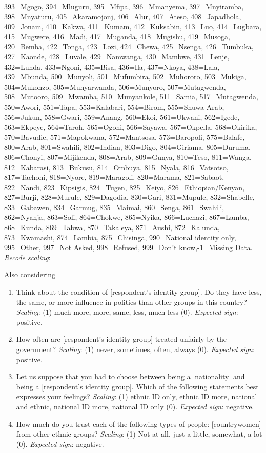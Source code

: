 \documentclass[]{article}
\begin{document}
\begin{enumerate}
393=Mgogo, 394=Mluguru, 395=Mfipa, 396=Mmanyema, 397=Mnyiramba, 398=Mnyaturu, 405=Akaramojonj, 406=Alur, 407=Ateso, 408=Japadhola, 409=Jonam, 410=Kakwa, 411=Kumam, 412=Kuksabin, 413=Luo, 414=Lugbara, 415=Mugwere, 416=Madi, 417=Muganda, 418=Mugishu, 419=Musoga, 420=Bemba, 422=Tonga, 423=Lozi, 424=Chewa, 425=Nsenga, 426=Tumbuka, 427=Kaonde, 428=Luvale, 429=Namwanga, 430=Mambwe, 431=Lenje, 432=Lunda, 433=Ngoni, 435=Bisa, 436=Ila, 437=Nkoya, 438=Lala, 439=Mbunda, 500=Munyoli, 501=Mufumbira, 502=Muhororo, 503=Mukiga, 504=Mukonzo, 505=Munyarwanda, 506=Munyoro, 507=Mutagwenda, 508=Mutooro, 509=Mwamba, 510=Munyankole, 511=Samia, 517=Mutagwenda, 550=Awori, 551=Tapa, 553=Kalabari, 554=Birom, 555=Shuwa-Arab, 556=Jukun, 558=Gwari, 559=Anang, 560=Ekoi, 561=Ukwani, 562=Igede, 563=Ekpeye, 564=Taroh, 565=Ogoni, 566=Sayawa, 567=Okpella, 568=Okirika, 570=Bavudie, 571=Mapokwana, 572=Mantsosa, 573=Baropoli, 575=Balafe, 800=Arab, 801=Swahili, 802=Indian, 803=Digo, 804=Giriama, 805=Duruma, 806=Chonyi, 807=Mijikenda, 808=Arab, 809=Gunya, 810=Teso, 811=Wanga, 812=Kabarasi, 813=Bukusu, 814=Ombuya, 815=Nyala, 816=Vatsotso, 817=Tachoni, 818=Nyore, 819=Maragoli, 820=Marama, 821=Sabaot, 822=Nandi, 823=Kipsigis, 824=Tugen, 825=Keiyo, 826=Ethiopian/Kenyan, 827=Burji, 828=Murule, 829=Dagodia, 830=Gari, 831=Mupule, 832=Shabelle, 833=Gabawen, 834=Garmug, 835=Maimai, 860=Senga, 861=Swahili, 862=Nyanja, 863=Soli, 864=Chokwe, 865=Nyika, 866=Luchazi, 867=Lamba, 868=Kunda, 869=Tabwa, 870=Takaleya, 871=Aushi, 872=Kalunda, 873=Kwamashi, 874=Lambia, 875=Chisinga, 990=National identity only, 995=Other, 997=Not Asked, 998=Refused, 999=Don’t know,-1=Missing Data. \\ \textit{Recode scaling}: 
\end{enumerate}

Also considering

\begin{enumerate}
  \item Think about the condition of [respondent’s identity group]. Do they have less, the same, or more influence in politics than other groups in this country? \textit{Scaling}: (1) much more, more, same, less, much less (0).  \textit{Expected sign}: positive.
  \item How often are [respondent’s identity group] treated unfairly by the government? \textit{Scaling}: (1) never, sometimes, often, always (0).  \textit{Expected sign}: positive.
  \item Let us suppose that you had to choose between being a [nationality] and being a [respondent’s identity group]. Which of the following statements best expresses your feelings? \textit{Scaling}: (1) ethnic ID only, ethnic ID more, national and ethnic, national ID more, national ID only (0).  \textit{Expected sign}: negative.
  \item How much do you trust each of the following types of people: [countrywomen] from other ethnic groups? \textit{Scaling}: (1) Not at all, just a little, somewhat, a lot (0).  \textit{Expected sign}: negative.
\end{enumerate}
\end{document}
